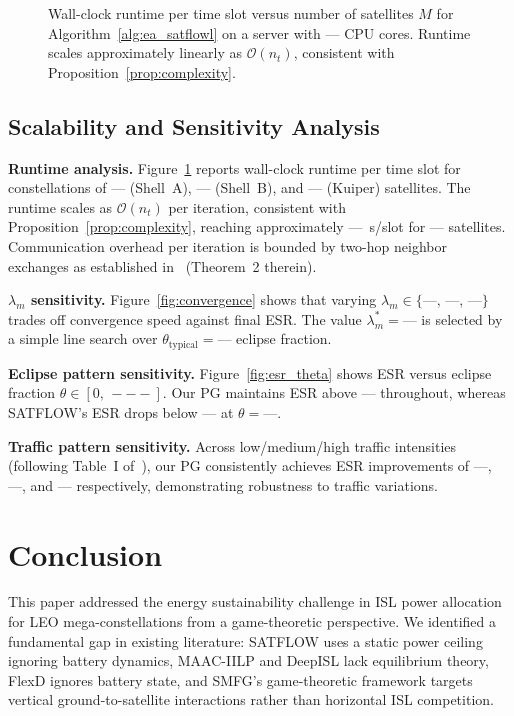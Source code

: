 \documentclass[journal]{IEEEtran}
\begin{document}
\begin{figure}[t]
\centering
\caption{Wall-clock runtime per time slot versus
number of satellites $M$ for
Algorithm~\ref{alg:ea_satflowl} on a server with
--- CPU cores. Runtime scales approximately linearly
as $\mathcal{O}(n_t)$, consistent with
Proposition~\ref{prop:complexity}.}
\label{fig:runtime}
\end{figure}

\subsection{Scalability and Sensitivity Analysis}

\textbf{Runtime analysis.}
Figure~\ref{fig:runtime} reports wall-clock runtime per time slot for constellations of --- (Shell~A), --- (Shell~B), and --- (Kuiper) satellites. The runtime scales as $\mathcal{O}(n_t)$ per iteration, consistent with Proposition~\ref{prop:complexity}, reaching approximately ---~s/slot for --- satellites. Communication overhead per iteration is bounded by two-hop neighbor exchanges as established in~\cite{cen2024satflow} (Theorem~2 therein).

\textbf{$\lambda_m$ sensitivity.}
Figure~\ref{fig:convergence} shows that varying $\lambda_m \in \{\text{---},\,\text{---},\,\text{---}\}$ trades off convergence speed against final ESR. The value $\lambda_m^* = \text{---}$ is selected by a simple line search over $\theta_{\mathrm{typical}}=\text{---}$ eclipse fraction.

\textbf{Eclipse pattern sensitivity.}
Figure~\ref{fig:esr_theta} shows ESR versus eclipse fraction $\theta \in [0,\,---]$. Our PG maintains ESR above --- throughout, whereas SATFLOW's ESR drops below --- at $\theta=\text{---}$.

\textbf{Traffic pattern sensitivity.}
Across low/medium/high traffic intensities (following Table~I of~\cite{cen2024satflow}), our PG consistently achieves ESR improvements of ---, ---, and --- respectively, demonstrating robustness to traffic variations.

\section{Conclusion}
\label{sec:conclusion}

This paper addressed the energy sustainability challenge in ISL power allocation for LEO mega-constellations from a game-theoretic perspective. We identified a fundamental gap in existing literature: SATFLOW uses a static power ceiling ignoring battery dynamics, MAAC-IILP and DeepISL lack equilibrium theory, FlexD ignores battery state, and SMFG's game-theoretic framework targets vertical ground-to-satellite interactions rather than horizontal ISL competition.
\end{document}
